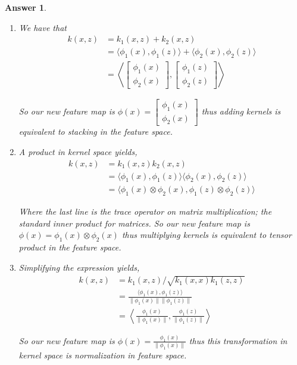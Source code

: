 \documentclass[12pt]{article}
\theoremstyle{colon}
\newtheorem*{answer}{Answer}
\begin{document}
\begin{answer}
  \

  \begin{enumerate}[label=\alph*)]
    \item We have that
      \begin{align*}
        k(x,z) &= k_1(x,z) + k_2(x,z) \\
        &= \langle \phi_1(x), \phi_1(z) \rangle + \langle \phi_2(x), \phi_2(z) \rangle \\
        &= \left\langle \begin{bmatrix} \phi_1(x) \\ \phi_2(x) \end{bmatrix}, \begin{bmatrix} \phi_1(z) \\ \phi_2(z) \end{bmatrix} \right\rangle
      \end{align*}

      So our new feature map is $\phi(x) = \begin{bmatrix} \phi_1(x) \\ \phi_2(x) \end{bmatrix}$ thus adding kernels is equivalent to stacking in the feature space.

    \item A product in kernel space yields,
      \begin{align*}
        k(x,z) &= k_1(x,z) k_2(x,z) \\
        &= \langle \phi_1(x), \phi_1(z) \rangle \langle \phi_2(x), \phi_2(z) \rangle \\
        &= \langle \phi_1(x) \otimes \phi_2(x), \phi_1(z) \otimes \phi_2(z) \rangle
      \end{align*}

      Where the last line is the trace operator on matrix multiplication; the standard inner product for matrices. So our new feature map is $\phi(x) = \phi_1(x) \otimes \phi_2(x)$ thus multiplying kernels is equivalent to tensor product in the feature space.

    \item Simplifying the expression yields,
      \begin{align*}
        k(x,z) &= k_1(x,z)/ \sqrt{k_1(x,x) k_1(z,z)} \\
        &= \frac{\langle \phi_1(x), \phi_1(z) \rangle}{\lVert \phi_1(x)\rVert \lVert \phi_1(z) \rVert}   \\
        &= \left\langle \frac{\phi_1(x)}{\lVert \phi_1(x) \rVert}, \frac{\phi_1(z)}{\lVert \phi_1(z) \rVert} \right\rangle
      \end{align*}

      So our new feature map is $\phi(x) = \frac{\phi_1(x) }{\lVert \phi_1(x) \rVert}$ thus this transformation in kernel space is normalization in feature space.
  \end{enumerate}
\end{answer}
\end{document}
